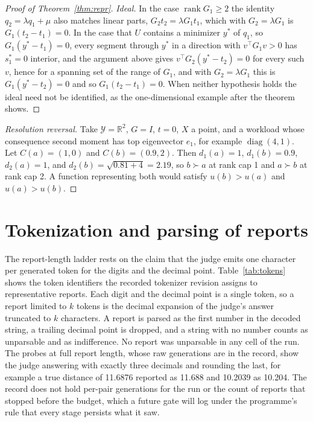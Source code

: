 \documentclass{article}
\theoremstyle{definition}
\theoremstyle{remark}
\newcommand{\Y}{\mathcal{Y}}
\newcommand{\R}{\mathbb{R}}
\begin{document}
\begin{proof}[Proof of Theorem~\ref{thm:repr}]
\emph{Ideal.}
In the case $\operatorname{rank}G_{1}\ge2$ the identity $q_{2}=\lambda q_{1}+\mu$ also matches linear parts, $G_{2}t_{2}=\lambda G_{1}t_{1}$, which with $G_{2}=\lambda G_{1}$ is $G_{1}(t_{2}-t_{1})=0$.
In the case that $U$ contains a minimizer $y^{*}$ of $q_{1}$, so $G_{1}(y^{*}-t_{1})=0$, every segment through $y^{*}$ in a direction with $v^{\top}G_{1}v>0$ has $s^{*}_{1}=0$ interior, and the argument above gives $v^{\top}G_{2}(y^{*}-t_{2})=0$ for every such $v$, hence for a spanning set of the range of $G_{1}$, and with $G_{2}=\lambda G_{1}$ this is $G_{1}(y^{*}-t_{2})=0$ and so $G_{1}(t_{2}-t_{1})=0$.
When neither hypothesis holds the ideal need not be identified, as the one-dimensional example after the theorem shows.
\end{proof}

\begin{proof}[Resolution reversal]
Take $\Y=\R^{2}$, $G=I$, $t=0$, $X$ a point, and a workload whose consequence second moment has top eigenvector $e_{1}$, for example $\operatorname{diag}(4,1)$.
Let $C(a)=(1,0)$ and $C(b)=(0.9,2)$.
Then $d_{1}(a)=1$, $d_{1}(b)=0.9$, $d_{2}(a)=1$, and $d_{2}(b)=\sqrt{0.81+4}=2.19$, so $b\succ a$ at rank cap 1 and $a\succ b$ at rank cap 2.
A function representing both would satisfy $u(b)>u(a)$ and $u(a)>u(b)$.
\end{proof}

\section{Tokenization and parsing of reports}
\label{app:tokens}

The report-length ladder rests on the claim that the judge emits one character per generated token for the digits and the decimal point.
Table~\ref{tab:tokens} shows the token identifiers the recorded tokenizer revision assigns to representative reports.
Each digit and the decimal point is a single token, so a report limited to $k$ tokens is the decimal expansion of the judge's answer truncated to $k$ characters.
A report is parsed as the first number in the decoded string, a trailing decimal point is dropped, and a string with no number counts as unparsable and as indifference.
No report was unparsable in any cell of the run.
The probes at full report length, whose raw generations are in the record, show the judge answering with exactly three decimals and rounding the last, for example a true distance of 11.6876 reported as 11.688 and 10.2039 as 10.204.
The record does not hold per-pair generations for the run or the count of reports that stopped before the budget, which a future gate will log under the programme's rule that every stage persists what it saw.
\end{document}
